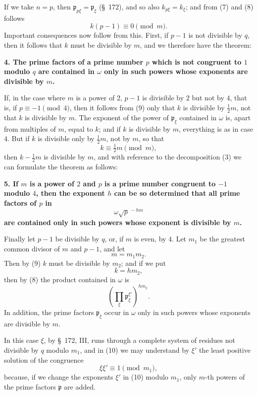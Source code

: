 \documentclass[11pt]{article}
\newcommand{\pp}{\mathfrak p}
\begin{document}
If we take $n=p$, then $\pp_{p\xi}=\pp_\xi$ (\S~172), and so also $k_{p\xi}=k_\xi$; and from (7) and (8) follows
\begin{equation}
  k(p-1)\equiv0\pmod m.
\tag{9}
\end{equation}
Important consequences now follow from this. First, if $p-1$ is not divisible by $q$, then it follows that $k$ must be divisible by $m$, and we therefore have the theorem:

\textbf{4. The prime factors of a prime number $p$ which is not congruent to $1$ modulo $q$ are contained in $\omega$ only in such powers whose exponents are divisible by $m$.}

If, in the case where $m$ is a power of $2$, $p-1$ is divisible by $2$ but not by $4$, that is, if $p\equiv -1\pmod4$, then it follows from (9) only that $k$ is divisible by $\tfrac12m$, not that $k$ is divisible by $m$. The exponent of the power of $\pp_\xi$ contained in $\omega$ is, apart from multiples of $m$, equal to $k$; and if $k$ is divisible by $m$, everything is as in case 4. But if $k$ is divisible only by $\tfrac12m$, not by $m$, so that
\[
  k\equiv \tfrac12m\pmod m,
\]
then $k-\tfrac12m$ is divisible by $m$, and with reference to the decomposition (3) we can formulate the theorem as follows:

\textbf{5. If $m$ is a power of $2$ and $p$ is a prime number congruent to $-1$ modulo $4$, then the exponent $h$ can be so determined that all prime factors of $p$ in}
\[
  \omega\sqrt{p}^{\,-hm}
\]
\textbf{are contained only in such powers whose exponent is divisible by $m$.}

Finally let $p-1$ be divisible by $q$, or, if $m$ is even, by $4$. Let $m_1$ be the greatest common divisor of $m$ and $p-1$, and let
\[
  m=m_1m_2.
\]
Then by (9) $k$ must be divisible by $m_2$; and if we put
\[
  k=hm_2,
\]
then by (8) the product contained in $\omega$ is
\begin{equation}
  \left(\prod_\xi \pp_\xi^{\xi'}\right)^{hm_2}.
\tag{10}
\end{equation}
In addition, the prime factors $\pp_\xi$ occur in $\omega$ only in such powers whose exponents are divisible by $m$.

In this case $\xi$, by \S~172, III, runs through a complete system of residues not divisible by $q$ modulo $m_1$, and in (10) we may understand by $\xi'$ the least positive solution of the congruence
\[
  \xi\xi'\equiv1\pmod{m_1},
\]
because, if we change the exponents $\xi'$ in (10) modulo $m_1$, only $m$-th powers of the prime factors $\pp$ are added.
\end{document}
